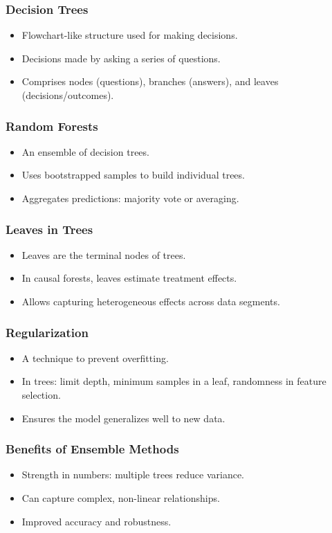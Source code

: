 \documentclass{beamer}
\begin{document}
\begin{frame}
\frametitle{Decision Trees}
\begin{itemize}
    \item Flowchart-like structure used for making decisions.
    \item Decisions made by asking a series of questions.
    \item Comprises nodes (questions), branches (answers), and leaves (decisions/outcomes).
\end{itemize}
\end{frame}

\begin{frame}
\frametitle{Random Forests}
\begin{itemize}
    \item An ensemble of decision trees.
    \item Uses bootstrapped samples to build individual trees.
    \item Aggregates predictions: majority vote or averaging.
\end{itemize}
\end{frame}

\begin{frame}
\frametitle{Leaves in Trees}
\begin{itemize}
    \item Leaves are the terminal nodes of trees.
    \item In causal forests, leaves estimate treatment effects.
    \item Allows capturing heterogeneous effects across data segments.
\end{itemize}
\end{frame}

\begin{frame}
\frametitle{Regularization}
\begin{itemize}
    \item A technique to prevent overfitting.
    \item In trees: limit depth, minimum samples in a leaf, randomness in feature selection.
    \item Ensures the model generalizes well to new data.
\end{itemize}
\end{frame}

\begin{frame}
\frametitle{Benefits of Ensemble Methods}
\begin{itemize}
    \item Strength in numbers: multiple trees reduce variance.
    \item Can capture complex, non-linear relationships.
    \item Improved accuracy and robustness.
\end{itemize}
\end{frame}
\end{document}
